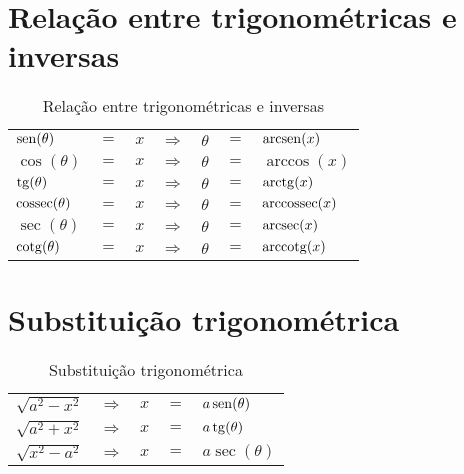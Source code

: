 \section{Relação entre trigonométricas e inversas}
	\begin{table}[H]
		\caption{Relação entre trigonométricas e inversas}
		\label{relacao_trigonometricas_inversas}
		\centering
		\begin{tabular}{|lclclcl|}
			$\operatorname{sen} (\theta)$    & $=$ & $x$ & $\Rightarrow$ & $\theta$ & $=$ & $\operatorname{arcsen} (x)$    \\
			$\cos (\theta)$    & $=$ & $x$ & $\Rightarrow$ & $\theta$ & $=$ & $\arccos (x)$    \\
			$\operatorname{tg} (\theta)$     & $=$ & $x$ & $\Rightarrow$ & $\theta$ & $=$ & $\operatorname{arctg} (x)$     \\
			$\operatorname{cossec} (\theta)$ & $=$ & $x$ & $\Rightarrow$ & $\theta$ & $=$ & $\operatorname{arccossec} (x)$ \\
			$\sec (\theta)$    & $=$ & $x$ & $\Rightarrow$ & $\theta$ & $=$ & $\operatorname{arcsec} (x)$    \\
			$\operatorname{cotg} (\theta)$   & $=$ & $x$ & $\Rightarrow$ & $\theta$ & $=$ & $\operatorname{arccotg} (x)$
		\end{tabular}		
	\end{table}

\section{Substituição trigonométrica}
	\begin{table}[H]
		\caption{Substituição trigonométrica}
		\label{substituicao_trigonometrica}
		\centering
		\begin{tabular}{|lclcl|}
			$\sqrt{a^2 - x^2}$ & $\Rightarrow$ & $x$ & $=$ & $a\operatorname{sen} (\theta)$ \\
			$\sqrt{a^2 + x^2}$ & $\Rightarrow$ & $x$ & $=$ & $a\operatorname{tg} (\theta)$  \\
			$\sqrt{x^2 - a^2}$ & $\Rightarrow$ & $x$ & $=$ & $a\sec (\theta)$
		\end{tabular}		
	\end{table}

